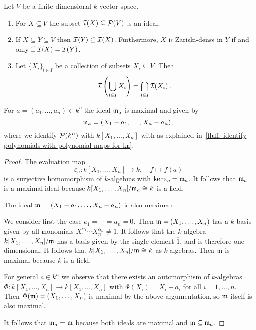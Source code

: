 \begin{lemma}
  Let $V$ be a finite-dimensional $k$-vector space.
  \begin{enumerate}
    \item
      For $X \subseteq V$ the subset $\mathcal{I}(X) \subseteq \mathcal{P}(V)$ is an ideal.
    \item
      If $X \subseteq Y \subseteq V$ then $\mathcal{I}(Y) \subseteq \mathcal{I}(X)$.
      Furthermore, $X$ is Zariski-dense in $Y$ if and only if $\mathcal{I}(X) = \mathcal{I}(Y)$.
    \item
      Let $\{X_i\}_{i \in I}$ be a collection of subsets $X_i \subseteq V$. Then
      \[
          \mathcal{I}\left( \bigcup_{i \in I} X_i \right)
        = \bigcap_{i \in I} \mathcal{I}(X_i) \,.
      \]
  \end{enumerate}
\end{lemma}


\begin{lemma}
  For $a = (a_1, \dotsc, a_n) \in k^n$ the ideal $\mathfrak{m}_a$ is maximal and given by
  \[
    \mathfrak{m}_a = (X_1 - a_1, \dotsc, X_n - a_n) \,,
  \]
  where we identify $\mathcal{P}(k^n)$ with $k[X_1, \dotsc, X_n]$ with  as explained in~\ref{fluff: identify polynomials with polynomial maps for kn}.
\end{lemma}


\begin{proof}
  The evaluation map
  \[
            \varepsilon_a
    \colon  k[X_1, \dotsc, X_n]
    \to     k,
    \quad   f
    \mapsto f(a)
  \]
  is a surjective homomorphism of $k$-algebras with $\ker \varepsilon_a = \mathfrak{m}_a$.
  It follows that $\mathfrak{m}_a$ is a maximal ideal because $k[X_1, \dotsc, X_n]/\mathfrak{m}_a \cong k$ is a field.
  
  The ideal $\mathfrak{m} \coloneqq (X_1 - a_1, \dotsc, X_n - a_n)$ is also maximal:
  
  We consider first the case $a_1 = \dotsb = a_n = 0$.
  Then $\mathfrak{m} = (X_1, \dotsc, X_n)$ has a $k$-basis given by all monomials $X_1^{\alpha_1} \dotsm X_n^{\alpha_n} \neq 1$.
  It follows that the $k$-algebra $k[X_1, \dotsc, X_n]/\mathfrak{m}$ has a basis given by the single element $\overline{1}$, and is therefore one-dimensional.
  It follows that $k[X_1, \dotsc, X_n]/\mathfrak{m} \cong k$ as $k$-algebras.
  Then $\mathfrak{m}$ is maximal because $k$ is a field.
  
  For general $a \in k^n$ we observe that there exists an automorphism of $k$-algebras $\Phi \colon k[X_1, \dotsc, X_n] \to k[X_1, \dotsc, X_n]$ with $\Phi(X_i) =  X_i + a_i$ for all $i = 1, \dotsc, n$.
  Then $\Phi(\mathfrak{m}) = (X_1, \dotsc, X_n)$ is maximal by the above argumentation, so $\mathfrak{m}$ itself is also maximal.
  
  It follows that $\mathfrak{m}_a = \mathfrak{m}$ because both ideals are maximal and $\mathfrak{m} \subseteq \mathfrak{m}_a$.
\end{proof}


